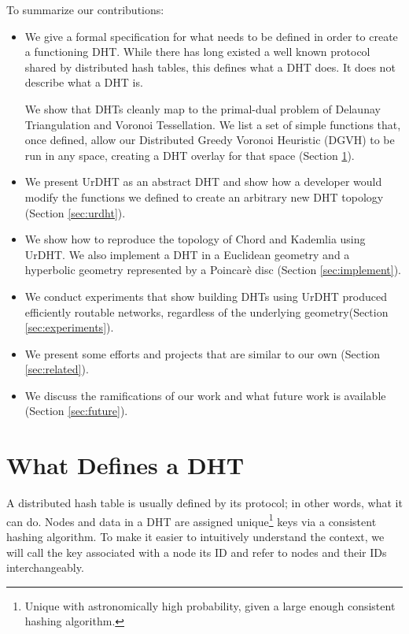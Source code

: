 To summarize our contributions:
\begin{itemize}
	\item We give a formal specification for what needs to be defined in order to create a functioning DHT.
	While there has long existed a well known protocol shared by distributed hash tables, this defines what a DHT does.
	It does not describe what a DHT is.
	
	We show that DHTs cleanly map to the primal-dual problem of Delaunay Triangulation and Voronoi Tessellation.
	We list a set of simple functions that, once defined, allow our Distributed Greedy Voronoi Heuristic (DGVH) to be run in any space, creating a DHT overlay for that space (Section \ref{sec:define}).
	
	\item We present UrDHT as an abstract DHT and show how a developer would modify the functions we defined to create an arbitrary new DHT topology (Section \ref{sec:urdht}).
	
	\item We show how to reproduce the topology of Chord and Kademlia using UrDHT.
	We also implement a DHT in a Euclidean geometry and a hyperbolic geometry represented by a Poincar\`{e} disc (Section \ref{sec:implement}).
	\item We conduct experiments that show building DHTs using UrDHT produced efficiently routable networks, regardless of the underlying geometry(Section \ref{sec:experiments}). 
	\item We present some efforts and projects that are similar to our own (Section \ref{sec:related}).
	\item We discuss the ramifications of our work and what future work is available (Section \ref{sec:future}).
\end{itemize}


\section{What Defines a DHT}
\label{sec:define}

A distributed hash table is usually defined by its protocol; in other words, what it can do.
Nodes and data in a DHT are assigned unique\footnote{Unique with astronomically high probability, given a large enough consistent hashing algorithm.} keys via a consistent hashing algorithm.
To make it easier to intuitively understand the context, we will call the key associated with a node its ID and refer to nodes and their IDs interchangeably.

